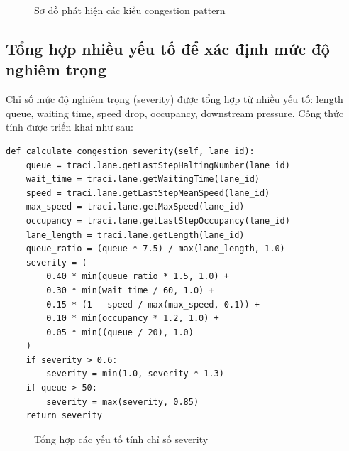 \begin{figure}[H]
    \centering
    \caption{Sơ đồ phát hiện các kiểu congestion pattern}
    \label{fig:congestion_patterns_diagram}
\end{figure}

\subsection{Tổng hợp nhiều yếu tố để xác định mức độ nghiêm trọng}
Chỉ số  mức độ nghiêm trọng (severity) được tổng hợp từ nhiều yếu tố: length queue, waiting time, speed drop, occupancy, downstream pressure. Công thức tính được triển khai như sau:

\begin{lstlisting}[style=py,caption={Hàm calculate\_congestion\_severity}]
def calculate_congestion_severity(self, lane_id):
    queue = traci.lane.getLastStepHaltingNumber(lane_id)
    wait_time = traci.lane.getWaitingTime(lane_id)
    speed = traci.lane.getLastStepMeanSpeed(lane_id)
    max_speed = traci.lane.getMaxSpeed(lane_id)
    occupancy = traci.lane.getLastStepOccupancy(lane_id)
    lane_length = traci.lane.getLength(lane_id)
    queue_ratio = (queue * 7.5) / max(lane_length, 1.0)
    severity = (
        0.40 * min(queue_ratio * 1.5, 1.0) +
        0.30 * min(wait_time / 60, 1.0) +
        0.15 * (1 - speed / max(max_speed, 0.1)) +
        0.10 * min(occupancy * 1.2, 1.0) +
        0.05 * min((queue / 20), 1.0)
    )
    if severity > 0.6:
        severity = min(1.0, severity * 1.3)
    if queue > 50:
        severity = max(severity, 0.85)
    return severity
\end{lstlisting}

\begin{figure}[H]
    \centering
    \caption{Tổng hợp các yếu tố tính chỉ số severity}
    \label{fig:severity_factors_diagram}
\end{figure}

